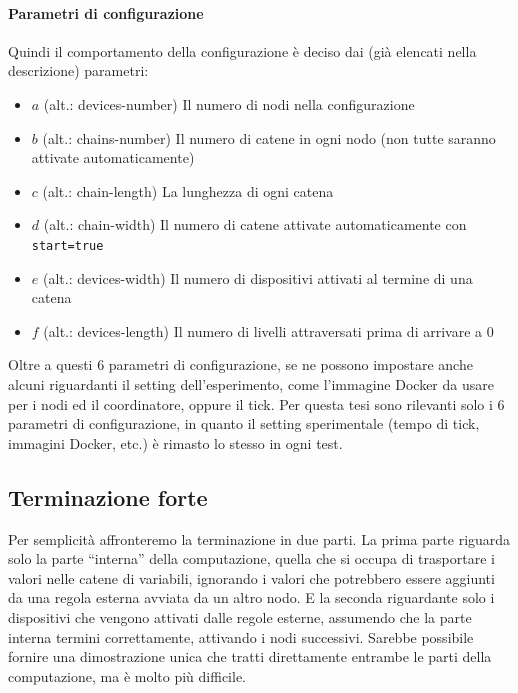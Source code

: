 \documentclass[12pt, a4paper]{article}
\begin{document}
\paragraph{Parametri di configurazione}

Quindi il comportamento della configurazione è deciso dai (già elencati nella descrizione) parametri:
\begin{itemize}
    \item $a$ (alt.: devices-number) Il numero di nodi nella configurazione
    \item $b$ (alt.: chains-number) Il numero di catene in ogni nodo (non tutte saranno attivate automaticamente)
    \item $c$ (alt.: chain-length) La lunghezza di ogni catena
    \item $d$ (alt.: chain-width) Il numero di catene attivate automaticamente con \lstinline{start=true}
    \item $e$ (alt.: devices-width) Il numero di dispositivi attivati al termine di una catena
    \item $f$ (alt.: devices-length) Il numero di livelli attraversati prima di arrivare a $0$
\end{itemize}

Oltre a questi 6 parametri di configurazione, se ne possono impostare anche alcuni riguardanti il setting dell'esperimento, come l'immagine Docker da usare per i nodi ed il coordinatore, oppure il tick.
Per questa tesi sono rilevanti solo i 6 parametri di configurazione, in quanto il setting sperimentale (tempo di tick, immagini Docker, etc.) è rimasto lo stesso in ogni test.

\subsection{Terminazione forte}

Per semplicità affronteremo la terminazione in due parti. La prima parte riguarda solo la parte ``interna'' della computazione, quella che si occupa di trasportare i valori nelle catene di variabili, ignorando i valori che potrebbero essere aggiunti da una regola esterna avviata da un altro nodo.
E la seconda riguardante solo i dispositivi che vengono attivati dalle regole esterne, assumendo che la parte interna termini correttamente, attivando i nodi successivi.
Sarebbe possibile fornire una dimostrazione unica che tratti direttamente entrambe le parti della computazione, ma è molto più difficile.
\end{document}
